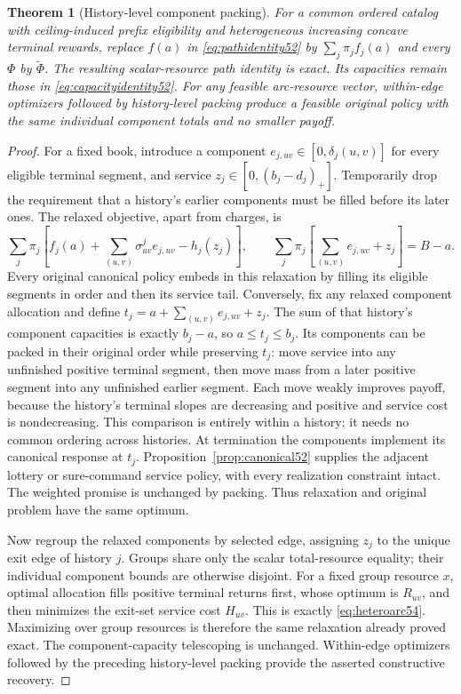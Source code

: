 \documentclass[11pt,letterpaper]{article}
\newtheorem{theorem}{Theorem}[section]
\theoremstyle{definition}\newtheorem{remark}[theorem]{Remark}
\begin{document}
\begin{theorem}[History-level component packing]\label{thm:packing54}
For a common ordered catalog with ceiling-induced prefix eligibility and heterogeneous increasing concave terminal rewards, replace $f(a)$ in \eqref{eq:pathidentity52} by $\sum_j\pi_jf_j(a)$ and every $\Phi$ by $\widetilde\Phi$. The resulting scalar-resource path identity is exact. Its capacities remain those in \eqref{eq:capacityidentity52}. For any feasible arc-resource vector, within-edge optimizers followed by history-level packing produce a feasible original policy with the same individual component totals and no smaller payoff.
\end{theorem}
\begin{proof}
For a fixed book, introduce a component $e_{j,uv}\in[0,\delta_j(u,v)]$ for every eligible terminal segment, and service $z_j\in[0,(b_j-d_j)_+]$. Temporarily drop the requirement that a history's earlier components must be filled before its later ones. The relaxed objective, apart from charges, is
\[
 \sum_j\pi_j\left[f_j(a)+\sum_{(u,v)}\sigma^j_{uv}e_{j,uv}-h_j(z_j)\right],
 \qquad \sum_j\pi_j\left[\sum_{(u,v)}e_{j,uv}+z_j\right]=B-a.
\]
Every original canonical policy embeds in this relaxation by filling its eligible segments in order and then its service tail. Conversely, fix any relaxed component allocation and define
$t_j=a+\sum_{(u,v)}e_{j,uv}+z_j$.
The sum of that history's component capacities is exactly $b_j-a$, so $a\leq t_j\leq b_j$. Its components can be packed in their original order while preserving $t_j$: move service into any unfinished positive terminal segment, then move mass from a later positive segment into any unfinished earlier segment. Each move weakly improves payoff, because the history's terminal slopes are decreasing and positive and service cost is nondecreasing. This comparison is entirely within a history; it needs no common ordering across histories. At termination the components implement its canonical response at $t_j$. Proposition~\ref{prop:canonical52} supplies the adjacent lottery or sure-command service policy, with every realization constraint intact. The weighted promise is unchanged by packing. Thus relaxation and original problem have the same optimum.

Now regroup the relaxed components by selected edge, assigning $z_j$ to the unique exit edge of history $j$. Groups share only the scalar total-resource equality; their individual component bounds are otherwise disjoint. For a fixed group resource $x$, optimal allocation fills positive terminal returns first, whose optimum is $R_{uv}$, and then minimizes the exit-set service cost $H_{uv}$. This is exactly \eqref{eq:heteroarc54}. Maximizing over group resources is therefore the same relaxation already proved exact. The component-capacity telescoping is unchanged. Within-edge optimizers followed by the preceding history-level packing provide the asserted constructive recovery.
\end{proof}
\end{document}
